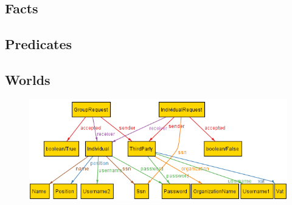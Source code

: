\documentclass[a4paper]{article}
\begin{document}
\subsection{Facts}
    
    
    
    
    
    
    
    
\subsection{Predicates}

    
    
    
    
    
    
    
    
\newpage
\subsection{Worlds}
    
    \begin{figure}[!ht]
    	\centering
    	\includegraphics[width=\textwidth]{RASD/images/alloy/data4Help.png}
    \end{figure}
    
\end{document}
